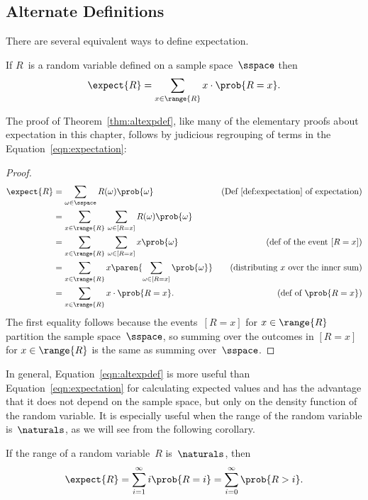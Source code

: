 \subsection{Alternate Definitions}

There are several equivalent ways to define expectation.

\begin{theorem}\label{thm:altexpdef}
If $R$~is a random variable defined on a sample space~$\sspace$ then
\begin{equation}\label{eqn:altexpdef}
    \expect{R} = \sum_{x \in \range{R}} x \cdot \prob{R = x}.
\end{equation}
\end{theorem}
The proof of Theorem~\ref{thm:altexpdef}, like many of the elementary proofs
about expectation in this chapter, follows by judicious regrouping of terms
in the Equation~\ref{eqn:expectation}:
\begin{proof}
\begin{align*}
\expect{R}
    &= \sum_{\omega \in \sspace} R(\omega) \prob{\omega}
            &\text{(Def~\ref{def:expectation} of expectation)} \\
    &= \sum_{x \in \range{R}} \, \sum_{\omega \in [R=x]} R(\omega) \prob{\omega}
                \\
    &= \sum_{x \in \range{R}} \, \sum_{\omega \in [R=x]} x \prob{\omega}
            &\text{(def of the event $[R=x]$)}\\
    &= \sum_{x \in \range{R}} x \paren{\sum_{\omega \in [R=x]} \prob{\omega}}
            & \text{(distributing $x$ over the inner sum)} \\
    &= \sum_{x \in \range{R}} x \cdot \prob{R = x}.
            & \text{(def of $\prob{R=x}$)}
\end{align*}
The first equality follows because the events~$[R=x]$ for $x \in
\range{R}$ partition the sample space~$\sspace$, so summing over the
outcomes in $[R=x]$ for $x \in \range{R}$ is the same as summing
over~$\sspace$.
\end{proof}

In general, Equation~\ref{eqn:altexpdef} is more useful than
Equation~\ref{eqn:expectation} for calculating expected values and has
the advantage that it does not depend on the sample space, but only on
the density function of the random variable.  It is especially useful
when the range of the random variable is~$\naturals$, as we will see
from the following corollary.

\begin{corollary}\label{cor:17A4}
If the range of a random variable~$R$ is~$\naturals$, then
\begin{align*}
\expect{R}
    = \sum_{i = 1}^\infty i \prob{R = i} %
    = \sum_{i = 0}^\infty \prob{R > i}. %
\end{align*}
\end{corollary}

